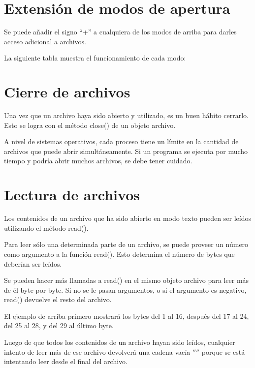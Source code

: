 \documentclass{report}
\newcommand{\doble}[1]{``#1''}
\begin{document}
\section{Extensión de modos de apertura}

Se puede añadir el signo \doble{+} a cualquiera de los modos de arriba para darles acceso adicional a archivos.

La siguiente tabla muestra el funcionamiento de cada modo:

\section{Cierre de archivos}

Una vez que un archivo haya sido abierto y utilizado, es un buen hábito cerrarlo. Esto se logra con el método close() de un objeto archivo.


A nivel de sistemas operativos, cada proceso tiene un límite en la cantidad de archivos que puede abrir simultáneamente. Si un programa se ejecuta por mucho tiempo y podría abrir muchos archivos, se debe tener cuidado.

\section{Lectura de archivos}

Los contenidos de un archivo que ha sido abierto en modo texto pueden ser leídos utilizando el método read().


Para leer sólo una determinada parte de un archivo, se puede proveer un número como argumento a la función read(). Esto determina el número de bytes que deberían ser leídos.

Se pueden hacer más llamadas a read() en el mismo objeto archivo para leer más de él byte por byte. Si no se le pasan argumentos, o si el argumento es negativo, read() devuelve el resto del archivo.


El ejemplo de arriba primero mostrará los bytes del 1 al 16, después del 17 al 24, del 25 al 28, y del 29 al último byte.

Luego de que todos los contenidos de un archivo hayan sido leídos, cualquier intento de leer más de ese archivo devolverá una cadena vacía $''$$''$ porque se está intentando leer desde el final del archivo.
\end{document}
